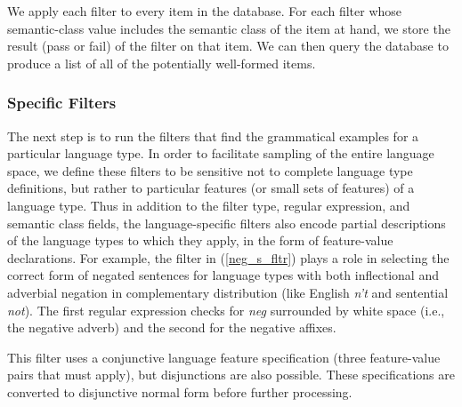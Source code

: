 \documentclass[11pt]{article}
\begin{document}
%
We apply each filter to every item in the database.  For each filter whose semantic-class value
includes the semantic class of the item at hand, we store the result
(pass or fail) of the filter on that item.  We can then query the database to produce a list of all of the
potentially well-formed items. %

\subsubsection{Specific Filters}

The next step is to run the filters that find the grammatical
examples for a particular language type.  In order to facilitate
sampling of the entire language space, we define these filters to be
sensitive not to complete language type definitions, but rather to
particular features (or small sets of features) of a language type.
Thus in addition to the filter type, regular expression, and semantic
class fields, the language-specific filters also encode partial
descriptions  of the language types to which they 
apply, in the form of feature-value declarations.  For example, the filter in (\ref{neg_s_fltr})
plays a role in selecting the correct form of negated sentences for
language types with both inflectional and adverbial negation
in complementary distribution (like English {\it n't}
and sentential {\it not}).  The first regular expression checks for
{\it neg} surrounded by white space (i.e., the negative adverb) and the
second for the negative affixes.

%
This filter uses a conjunctive language feature specification
(three feature-value pairs that must apply), but disjunctions are
also possible.  These
specifications are converted to disjunctive normal form before
further processing.
\end{document}
